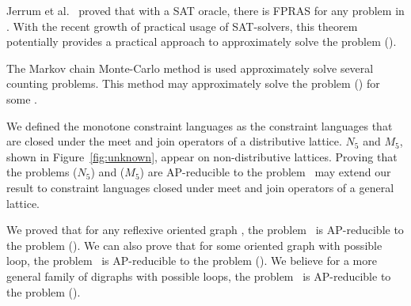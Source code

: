 Jerrum et al.~\cite{JVV} proved that with a SAT oracle, there is FPRAS for any 
problem in \cp\@. With the recent growth of practical usage of SAT-solvers, this theorem
potentially provides a practical approach to approximately solve the problem \ccsp(\mrelset).

The Markov chain Monte-Carlo method is used approximately solve several counting problems.
This method may approximately solve the problem \ccsp(\mrelset) for some \mrelset\@.

We defined the monotone constraint languages as the constraint languages that
are closed under the meet and join operators of a distributive lattice.
\(N_5\) and \(M_5\), shown in Figure~\ref{fig:unknown}, appear on non-distributive 
lattices. Proving that the problems \chom(\(N_5\)) and \chom(\(M_5\)) are AP-reducible to
the problem \cbis\ may extend our result to
constraint languages closed under meet and join operators of a general lattice.

We proved that for any reflexive oriented graph \mH, the problem \cbis\ is
AP-reducible to the problem \chom(\mH). We can also prove that for some
oriented graph with possible loop, the problem \cbis\ is AP-reducible to 
the problem \chom(\mH). We believe for a more general family of digraphs
with possible loops, the problem \cbis\ is AP-reducible to the problem \chom(\mH).